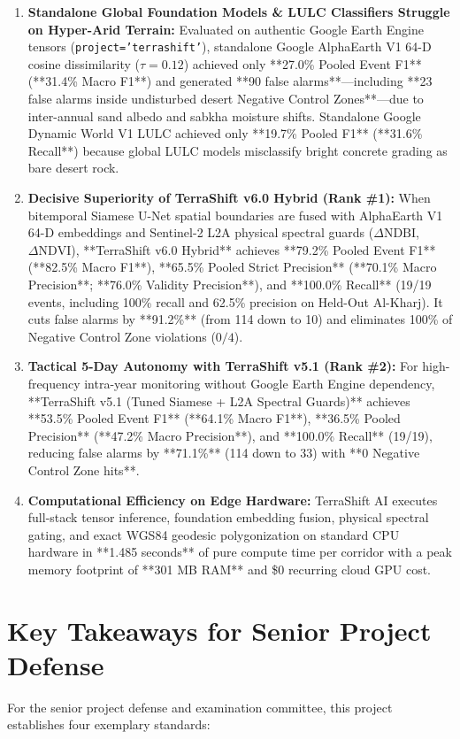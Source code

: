 \begin{enumerate}
    \item \textbf{Standalone Global Foundation Models & LULC Classifiers Struggle on Hyper-Arid Terrain:} Evaluated on authentic Google Earth Engine tensors (\texttt{project='terrashift'}), standalone Google AlphaEarth V1 64-D cosine dissimilarity ($\tau=0.12$) achieved only **27.0\% Pooled Event F1** (**31.4\% Macro F1**) and generated **90 false alarms**—including **23 false alarms inside undisturbed desert Negative Control Zones**—due to inter-annual sand albedo and sabkha moisture shifts. Standalone Google Dynamic World V1 LULC achieved only **19.7\% Pooled F1** (**31.6\% Recall**) because global LULC models misclassify bright concrete grading as bare desert rock.
    \item \textbf{Decisive Superiority of TerraShift v6.0 Hybrid (Rank \#1):} When bitemporal Siamese U-Net spatial boundaries are fused with AlphaEarth V1 64-D embeddings and Sentinel-2 L2A physical spectral guards ($\Delta\text{NDBI}$, $\Delta\text{NDVI}$), **TerraShift v6.0 Hybrid** achieves **79.2\% Pooled Event F1** (**82.5\% Macro F1**), **65.5\% Pooled Strict Precision** (**70.1\% Macro Precision**; **76.0\% Validity Precision**), and **100.0\% Recall** (19/19 events, including 100\% recall and 62.5\% precision on Held-Out Al-Kharj). It cuts false alarms by **91.2\%** (from 114 down to 10) and eliminates 100\% of Negative Control Zone violations ($0/4$).
    \item \textbf{Tactical 5-Day Autonomy with TerraShift v5.1 (Rank \#2):} For high-frequency intra-year monitoring without Google Earth Engine dependency, **TerraShift v5.1 (Tuned Siamese + L2A Spectral Guards)** achieves **53.5\% Pooled Event F1** (**64.1\% Macro F1**), **36.5\% Pooled Precision** (**47.2\% Macro Precision**), and **100.0\% Recall** (19/19), reducing false alarms by **71.1\%** (114 down to 33) with **0 Negative Control Zone hits**.
    \item \textbf{Computational Efficiency on Edge Hardware:} TerraShift AI executes full-stack tensor inference, foundation embedding fusion, physical spectral gating, and exact WGS84 geodesic polygonization on standard CPU hardware in **1.485 seconds** of pure compute time per corridor with a peak memory footprint of **301 MB RAM** and \$0 recurring cloud GPU cost.
\end{enumerate}

\section{Key Takeaways for Senior Project Defense}
\label{sec:concl_defense_takeaways}
For the senior project defense and examination committee, this project establishes four exemplary standards:

